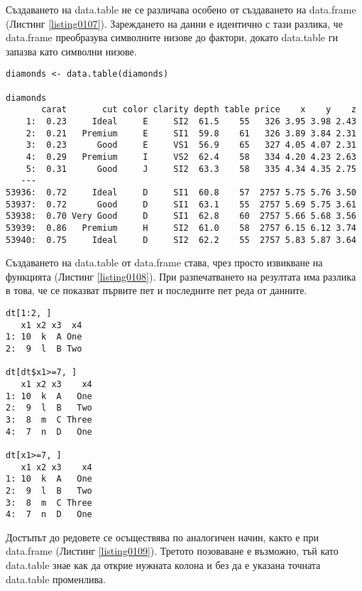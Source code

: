 Създаването на data.table не се различава особено от създаването на data.frame (Листинг \ref{listing0107}). Зареждането на данни е идентично с тази  разлика, че data.frame преобразува символните низове до фактори, докато data.table ги запазва като символни низове.

\begin{lstlisting}[caption=Зареждане на data.table от data.frame, label=listing0108]
diamonds <- data.table(diamonds)

diamonds
       carat       cut color clarity depth table price    x    y    z
    1:  0.23     Ideal     E     SI2  61.5    55   326 3.95 3.98 2.43
    2:  0.21   Premium     E     SI1  59.8    61   326 3.89 3.84 2.31
    3:  0.23      Good     E     VS1  56.9    65   327 4.05 4.07 2.31
    4:  0.29   Premium     I     VS2  62.4    58   334 4.20 4.23 2.63
    5:  0.31      Good     J     SI2  63.3    58   335 4.34 4.35 2.75
   ---                                                               
53936:  0.72     Ideal     D     SI1  60.8    57  2757 5.75 5.76 3.50
53937:  0.72      Good     D     SI1  63.1    55  2757 5.69 5.75 3.61
53938:  0.70 Very Good     D     SI1  62.8    60  2757 5.66 5.68 3.56
53939:  0.86   Premium     H     SI2  61.0    58  2757 6.15 6.12 3.74
53940:  0.75     Ideal     D     SI2  62.2    55  2757 5.83 5.87 3.64
\end{lstlisting}

Създаването на data.table от data.frame става, чрез просто извикване на функцията (Листинг \ref{listing0108}). При разпечатването на резултата има разлика в това, че се показват първите пет и последните пет реда от данните.

\begin{lstlisting}[caption=Достъп до редовете, label=listing0109]
dt[1:2, ]
   x1 x2 x3  x4
1: 10  k  A One
2:  9  l  B Two

dt[dt$x1>=7, ]
   x1 x2 x3    x4
1: 10  k  A   One
2:  9  l  B   Two
3:  8  m  C Three
4:  7  n  D   One

dt[x1>=7, ]
   x1 x2 x3    x4
1: 10  k  A   One
2:  9  l  B   Two
3:  8  m  C Three
4:  7  n  D   One
\end{lstlisting}

Достъпът до редовете се осъществява по аналогичен начин, както е при data.frame (Листинг \ref{listing0109}). Третото позоваване е възможно, тъй като data.table знае как да открие нужната колона и без да е указана точната data.table променлива.

